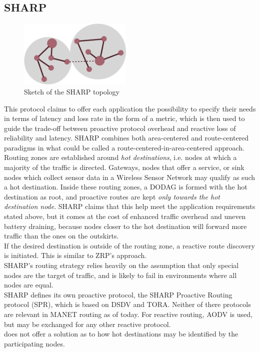 \documentclass[a4paper,10pt]{scrartcl}
\begin{document}

\subsection{\gls{SHARP}}
\label{subsec:sharp}
\begin{figure}
  \begin{center}
    \includegraphics[width=0.48\textwidth]{../images/SHARP}
  \end{center}
  \label{fig:area_centered}
  \caption{Sketch of the SHARP topology}
\end{figure}

This protocol claims to offer each application the possibility to specify their needs in terms of latency and loss rate in the form of a metric, which is then used to guide the trade-off between proactive protocol overhead and reactive loss of reliability and latency.
SHARP combines both area-centered and route-centered paradigms in what could be called a route-centered-in-area-centered approach. Routing zones are established around \emph{hot destinations}, i.e. nodes at which a majority of the traffic is directed. Gateways, nodes that offer a service, or sink nodes which collect sensor data in a Wireless Sensor Network may qualify as such a hot destination. Inside these routing zones, a \gls{DODAG} is formed with the hot destination as root, and proactive routes are kept \emph{only towards the hot destination node}. SHARP claims that this help meet the application requirements stated above, but it comes at the cost of enhanced traffic overhead and uneven battery draining, because nodes closer to the hot destination will forward more traffic than the ones on the outskirts.\\
If the desired destination is outside of the routing zone, a reactive route discovery is initiated. This is similar to ZRP's approach.\\
SHARP's routing strategy relies heavily on the assumption that only special nodes are the target of traffic, and is likely to fail in environments where all nodes are equal.\\
SHARP defines its own proactive protocol, the SHARP Proactive Routing protocol (SPR), which is based on DSDV\cite{DSDV} and TORA\cite{TORA}. Neither of there protocols are relevant in MANET routing as of today.
For reactive routing, AODV is used, but may be exchanged for any other reactive protocol.\\
\cite{SHARP} does not offer a solution as to how hot destinations may be identified by the participating nodes.
\end{document}
